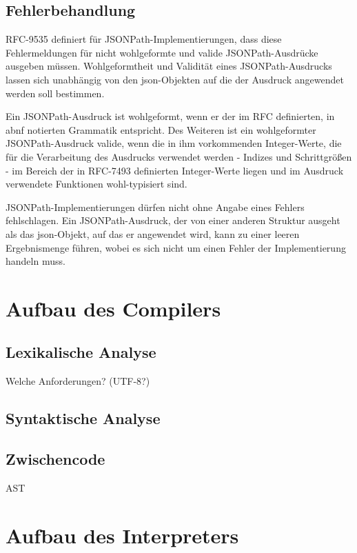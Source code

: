\documentclass[oneside]{ausarbeitung}
\begin{document}
	
	
\subsection{Fehlerbehandlung}
	
RFC-9535 definiert für JSONPath-Implementierungen, dass diese Fehlermeldungen für nicht wohlgeformte und valide JSONPath-Ausdrücke ausgeben müssen. Wohlgeformtheit und Validität eines JSONPath-Ausdrucks lassen sich unabhängig von den \ac{json}-Objekten auf die der Ausdruck angewendet werden soll bestimmen. 
	
Ein JSONPath-Ausdruck ist wohlgeformt, wenn er der im RFC definierten, in \ac{abnf} notierten Grammatik entspricht. Des Weiteren ist ein wohlgeformter JSONPath-Ausdruck valide, wenn die in ihm vorkommenden Integer-Werte, die für die Verarbeitung des Ausdrucks verwendet werden - Indizes und Schrittgrößen - im Bereich der in RFC-7493 definierten Integer-Werte liegen und im Ausdruck verwendete Funktionen wohl-typisiert sind. 
	
JSONPath-Implementierungen dürfen nicht ohne Angabe eines Fehlers fehlschlagen. Ein JSONPath-Ausdruck, der von einer anderen Struktur ausgeht als das \ac{json}-Objekt, auf das er angewendet wird, kann zu einer leeren Ergebnismenge führen, wobei es sich nicht um einen Fehler der Implementierung handeln muss.
	
	
	
	
	
	
	
\section{Aufbau des Compilers}
	
\subsection{Lexikalische Analyse}
Welche Anforderungen? (UTF-8?)
	
\subsection{Syntaktische Analyse}
	
\subsection{Zwischencode}
AST
	
	
\section{Aufbau des Interpreters}
	
\end{document}
